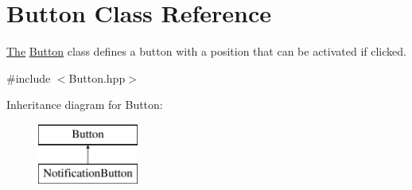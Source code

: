 \hypertarget{class_button}{}\section{Button Class Reference}
\label{class_button}


\hyperlink{namespace_the}{The} \hyperlink{class_button}{Button} class defines a button with a position that can be activated if clicked.  




{\ttfamily \#include $<$Button.\+hpp$>$}

Inheritance diagram for Button\+:\begin{figure}[H]
\begin{center}
\leavevmode
\includegraphics[height=2.000000cm]{class_button}
\end{center}
\end{figure}
